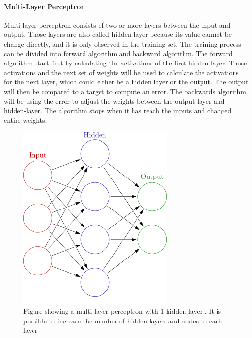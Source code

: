 \documentclass[USenglish]{ifimaster}  %
\begin{document}
\paragraph{Multi-Layer Perceptron}
Multi-layer perceptron consists of two or more layers between the input and output. Those layers are also called hidden layer because its value cannot be change directly, and it is only observed in the training set. The training process can be divided into forward algorithm and backward algorithm. The forward algorithm start first by calculating the activations of the first hidden layer. Those activations and the next set of weights will be used to calculate the activations for the next layer, which could either be a hidden layer or the output. The output will then be compared to a target to compute an error. The backwards algorithm will be using the error to adjust the weights between the output-layer and hidden-layer. The algorithm stops when it has reach the inputs and changed entire weights.
	
	
\begin{figure}[h]
	\centering
	\includegraphics[scale=0.6]{Figures/MLP.png}
	\caption{Figure showing a multi-layer perceptron with 1 hidden layer \cite{MLP}. It is possible to increase the number of hidden layers and nodes to each layer}
	\label{fig:MLP}
\end{figure}
	
\end{document}
